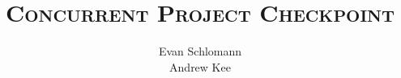 \documentclass[12pt]{article}
\begin{document}
\doublespacing
\title{\Huge \textsc{Concurrent Project Checkpoint}}
\author{Evan Schlomann \\ Andrew Kee}

\maketitle
\vfill

\pagebreak



\vspace{.1in}


\end{document}
